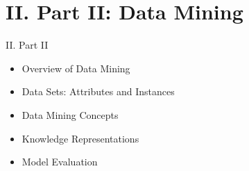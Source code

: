 \documentclass[handout]{beamer}
\begin{document}




\section{II. Part II: Data Mining}
\begin{frame}{II. Part II}
\begin{itemize}
\item[II.1] Overview of Data Mining
\item[II.2] Data Sets: Attributes and Instances
\item[II.3] Data Mining Concepts
\item[II.4] Knowledge Representations
\item[II.5] Model Evaluation
\end{itemize}
\end{frame}
\end{document}
